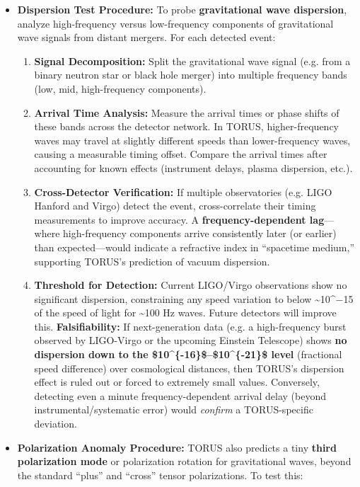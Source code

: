 \begin{itemize}
\item
  \textbf{Dispersion Test Procedure:} To probe \textbf{gravitational
  wave dispersion}, analyze high-frequency versus low-frequency
  components of gravitational wave signals from distant mergers. For
  each detected event:

  \begin{enumerate}
  \def\labelenumi{\arabic{enumi}.}
  \item
    \textbf{Signal Decomposition:} Split the gravitational wave signal
    (e.g. from a binary neutron star or black hole merger) into multiple
    frequency bands (low, mid, high-frequency components).
  \item
    \textbf{Arrival Time Analysis:} Measure the arrival times or phase
    shifts of these bands across the detector network. In TORUS,
    higher-frequency waves may travel at slightly different speeds than
    lower-frequency waves, causing a measurable timing offset​. Compare
    the arrival times after accounting for known effects (instrument
    delays, plasma dispersion, etc.).
  \item
    \textbf{Cross-Detector Verification:} If multiple observatories
    (e.g. LIGO Hanford and Virgo) detect the event, cross-correlate
    their timing measurements to improve accuracy. A
    \textbf{frequency-dependent lag}---where high-frequency components
    arrive consistently later (or earlier) than expected---would
    indicate a refractive index in ``spacetime medium,'' supporting
    TORUS's prediction of vacuum dispersion​.
  \item
    \textbf{Threshold for Detection:} Current LIGO/Virgo observations
    show no significant dispersion, constraining any speed variation to
    below \textasciitilde{}10\^{}−15 of the speed of light for
    \textasciitilde{}100 Hz waves. Future detectors will improve this.
    \textbf{Falsifiability:} If next-generation data (e.g. a
    high-frequency burst observed by LIGO-Virgo or the upcoming Einstein
    Telescope) shows \textbf{no dispersion down to the
    \$10\^{}\{-16\}\$--\$10\^{}\{-21\}\$ level} (fractional speed
    difference) over cosmological distances, then TORUS's dispersion
    effect is ruled out or forced to extremely small values​.
    Conversely, detecting even a minute frequency-dependent arrival
    delay (beyond instrumental/systematic error) would \emph{confirm} a
    TORUS-specific deviation.
  \end{enumerate}
\item
  \textbf{Polarization Anomaly Procedure:} TORUS also predicts a tiny
  \textbf{third polarization mode} or polarization rotation for
  gravitational waves, beyond the standard ``plus'' and ``cross'' tensor
  polarizations​. To test this:


\end{itemize}

